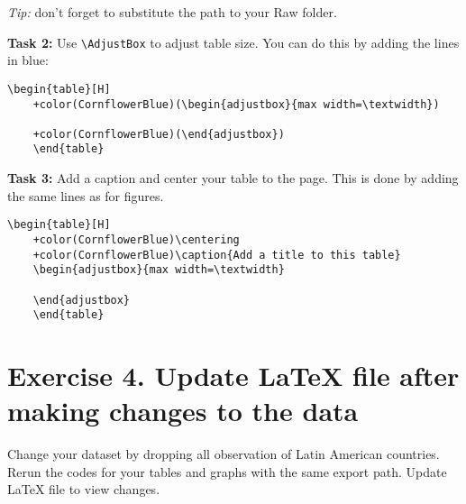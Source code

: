 \documentclass[12pts]{report}
\begin{document}
\begin{center}
	\textcolor{BurntOrange}{\emph{Tip:} don't forget to substitute the path to your Raw folder.}
\end{center}
		
\textbf{Task 2:} Use \verb|\AdjustBox| to adjust table size. You can do this by adding the lines in blue: 
	\begin{center}
	\begin{Verbatim}[commandchars=+\(\)]
	\begin{table}[H]
	+color(CornflowerBlue)(\begin{adjustbox}{max width=\textwidth})  
		
	+color(CornflowerBlue)(\end{adjustbox})
	\end{table}
	\end{Verbatim}
	\end{center}

\begin{center}
\end{center}

\textbf{Task 3:} Add a caption and center your table to the page. This is done by adding the same lines as for figures.

	\begin{center}
	\begin{Verbatim}[commandchars=+\(\)]
	\begin{table}[H]
	+color(CornflowerBlue)\centering
	+color(CornflowerBlue)\caption{Add a title to this table}
	\begin{adjustbox}{max width=\textwidth}
		
	\end{adjustbox}
	\end{table}
	\end{Verbatim}
	\end{center}

\section*{Exercise 4. Update {\LaTeX} file after making changes to the data}
Change your dataset by dropping all observation of Latin American countries. Rerun the codes for your tables and graphs with the same export path. Update {\LaTeX} file to view changes.
\end{document}
